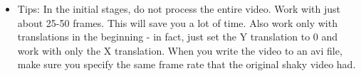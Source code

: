 \documentclass[11pt]{article}
\begin{document}
\begin{enumerate}
\begin{itemize}
\item Tips: In the initial stages, do not process the entire video. Work with just about 25-50 frames. This will save you a lot of time. Also work only with translations in the beginning - in fact, just set the Y translation to 0 and work with only the X translation. When you write the video to an avi file, make sure you specify the same frame rate that the original shaky video had. 

\end{itemize}


\end{enumerate}
\end{document}
